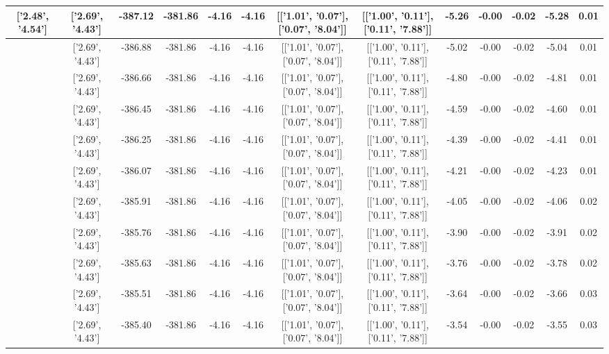 \begin{table}[htbp]
\begin{adjustbox}{angle=90}
\begin{tabular}{|c|c|c|c|c|c|c|c|c|c|c|c|c|}
 ['2.48', '4.54'] & ['2.69', '4.43'] & -387.12 & -381.86 & -4.16 & -4.16 & [['1.01', '0.07'], ['0.07', '8.04']] & [['1.00', '0.11'], ['0.11', '7.88']] & -5.26 & -0.00 & -0.02 & -5.28 & 0.01\\ \hline
 ['2.49', '4.53'] & ['2.69', '4.43'] & -386.88 & -381.86 & -4.16 & -4.16 & [['1.01', '0.07'], ['0.07', '8.04']] & [['1.00', '0.11'], ['0.11', '7.88']] & -5.02 & -0.00 & -0.02 & -5.04 & 0.01\\ \hline
 ['2.50', '4.53'] & ['2.69', '4.43'] & -386.66 & -381.86 & -4.16 & -4.16 & [['1.01', '0.07'], ['0.07', '8.04']] & [['1.00', '0.11'], ['0.11', '7.88']] & -4.80 & -0.00 & -0.02 & -4.81 & 0.01\\ \hline
 ['2.52', '4.52'] & ['2.69', '4.43'] & -386.45 & -381.86 & -4.16 & -4.16 & [['1.01', '0.07'], ['0.07', '8.04']] & [['1.00', '0.11'], ['0.11', '7.88']] & -4.59 & -0.00 & -0.02 & -4.60 & 0.01\\ \hline
 ['2.53', '4.51'] & ['2.69', '4.43'] & -386.25 & -381.86 & -4.16 & -4.16 & [['1.01', '0.07'], ['0.07', '8.04']] & [['1.00', '0.11'], ['0.11', '7.88']] & -4.39 & -0.00 & -0.02 & -4.41 & 0.01\\ \hline
 ['2.54', '4.51'] & ['2.69', '4.43'] & -386.07 & -381.86 & -4.16 & -4.16 & [['1.01', '0.07'], ['0.07', '8.04']] & [['1.00', '0.11'], ['0.11', '7.88']] & -4.21 & -0.00 & -0.02 & -4.23 & 0.01\\ \hline
 ['2.56', '4.50'] & ['2.69', '4.43'] & -385.91 & -381.86 & -4.16 & -4.16 & [['1.01', '0.07'], ['0.07', '8.04']] & [['1.00', '0.11'], ['0.11', '7.88']] & -4.05 & -0.00 & -0.02 & -4.06 & 0.02\\ \hline
 ['2.57', '4.49'] & ['2.69', '4.43'] & -385.76 & -381.86 & -4.16 & -4.16 & [['1.01', '0.07'], ['0.07', '8.04']] & [['1.00', '0.11'], ['0.11', '7.88']] & -3.90 & -0.00 & -0.02 & -3.91 & 0.02\\ \hline
 ['2.58', '4.49'] & ['2.69', '4.43'] & -385.63 & -381.86 & -4.16 & -4.16 & [['1.01', '0.07'], ['0.07', '8.04']] & [['1.00', '0.11'], ['0.11', '7.88']] & -3.76 & -0.00 & -0.02 & -3.78 & 0.02\\ \hline
 ['2.59', '4.48'] & ['2.69', '4.43'] & -385.51 & -381.86 & -4.16 & -4.16 & [['1.01', '0.07'], ['0.07', '8.04']] & [['1.00', '0.11'], ['0.11', '7.88']] & -3.64 & -0.00 & -0.02 & -3.66 & 0.03\\ \hline
 ['2.61', '4.48'] & ['2.69', '4.43'] & -385.40 & -381.86 & -4.16 & -4.16 & [['1.01', '0.07'], ['0.07', '8.04']] & [['1.00', '0.11'], ['0.11', '7.88']] & -3.54 & -0.00 & -0.02 & -3.55 & 0.03\\ \hline

\end{tabular}
\end{adjustbox}
\end{table}
